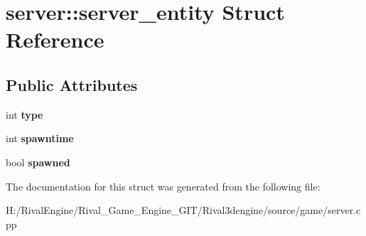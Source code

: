 \hypertarget{structserver_1_1server__entity}{}\section{server\+:\+:server\+\_\+entity Struct Reference}
\label{structserver_1_1server__entity}
\subsection*{Public Attributes}
\begin{DoxyCompactItemize}
\item 
\mbox{\label{structserver_1_1server__entity_a5c16f476b3398f21364a77f59775c771}} 
int {\bfseries type}
\item 
\mbox{\label{structserver_1_1server__entity_a99d0c8939213990aa1ed484c61bf8567}} 
int {\bfseries spawntime}
\item 
\mbox{\label{structserver_1_1server__entity_adea550304f85c06301975a0c3664ee15}} 
bool {\bfseries spawned}
\end{DoxyCompactItemize}


The documentation for this struct was generated from the following file\+:\begin{DoxyCompactItemize}
\item 
H\+:/\+Rival\+Engine/\+Rival\+\_\+\+Game\+\_\+\+Engine\+\_\+\+G\+I\+T/\+Rival3dengine/source/game/server.\+cpp\end{DoxyCompactItemize}
